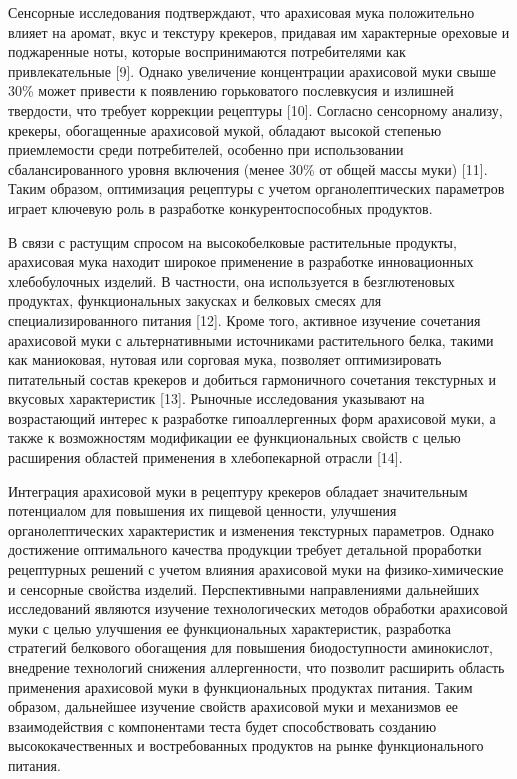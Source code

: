 \begin{multicols}{2}
Сенсорные исследования подтверждают, что арахисовая мука положительно
влияет на аромат, вкус и текстуру крекеров, придавая им характерные
ореховые и поджаренные ноты, которые воспринимаются потребителями как
привлекательные {[}9{]}. Однако увеличение концентрации арахисовой муки
свыше 30\% может привести к появлению горьковатого послевкусия и
излишней твердости, что требует коррекции рецептуры {[}10{]}. Согласно
сенсорному анализу, крекеры, обогащенные арахисовой мукой, обладают
высокой степенью приемлемости среди потребителей, особенно при
использовании сбалансированного уровня включения (менее 30\% от общей
массы муки) {[}11{]}. Таким образом, оптимизация рецептуры с учетом
органолептических параметров играет ключевую роль в разработке
конкурентоспособных продуктов.

В связи с растущим спросом на высокобелковые растительные продукты,
арахисовая мука находит широкое применение в разработке инновационных
хлебобулочных изделий. В частности, она используется в безглютеновых
продуктах, функциональных закусках и белковых смесях для
специализированного питания {[}12{]}. Кроме того, активное изучение
сочетания арахисовой муки с альтернативными источниками растительного
белка, такими как маниоковая, нутовая или сорговая мука, позволяет
оптимизировать питательный состав крекеров и добиться гармоничного
сочетания текстурных и вкусовых характеристик {[}13{]}. Рыночные
исследования указывают на возрастающий интерес к разработке
гипоаллергенных форм арахисовой муки, а также к возможностям модификации
ее функциональных свойств с целью расширения областей применения в
хлебопекарной отрасли {[}14{]}.

Интеграция арахисовой муки в рецептуру крекеров обладает значительным
потенциалом для повышения их пищевой ценности, улучшения
органолептических характеристик и изменения текстурных параметров.
Однако достижение оптимального качества продукции требует детальной
проработки рецептурных решений с учетом влияния арахисовой муки на
физико-химические и сенсорные свойства изделий. Перспективными
направлениями дальнейших исследований являются изучение технологических
методов обработки арахисовой муки с целью улучшения ее функциональных
характеристик, разработка стратегий белкового обогащения для повышения
биодоступности аминокислот, внедрение технологий снижения аллергенности,
что позволит расширить область применения арахисовой муки в
функциональных продуктах питания. Таким образом, дальнейшее изучение
свойств арахисовой муки и механизмов ее взаимодействия с компонентами
теста будет способствовать созданию высококачественных и востребованных
продуктов на рынке функционального питания.


\end{multicols}
